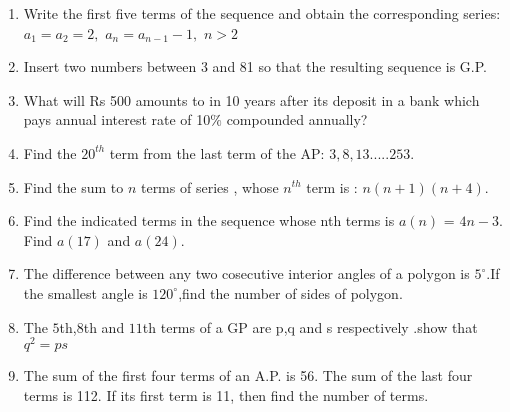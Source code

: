 \begin{enumerate}[label=\thesection.\arabic*,ref=\thesection.\theenumi]
\item Write the first five terms of the sequence and obtain the corresponding series:\\
$a_1=a_2=2,$ $a_n=a_{n-1} -1,$ $n>2$\\
\solution

\pagebreak
\item Insert two numbers between 3 and 81 so that the resulting sequence is G.P.\\

\solution

\pagebreak

\item  What will Rs 500 amounts to in 10 years after its deposit in a bank which pays annual interest rate of 10$\%$ compounded annually?

\solution
    
\pagebreak

\item Find the $20^{th}$ term from the last term of the AP: $3,8,13.....253$.

\solution


\pagebreak
\item Find the sum to $n$ terms of series , whose $n^{th}$ term is : $n(n+1)(n+4)$.

\solution

\pagebreak

\item Find the indicated terms in the sequence whose nth terms is $a(n)$ = $4n-3$. Find $a(17)$ and $a(24)$.
    
\solution 

\pagebreak

\item The difference between any two cosecutive interior angles of a polygon is $5^\circ$.If the smallest angle is $120^\circ$,find the number of sides of polygon. \\
\solution

\pagebreak
\item The $5$th,$8$th and $11$th terms of a GP are p,q and s respectively .show that $q^2=ps$ \\
\solution

\pagebreak
\item The sum of the first four terms of an A.P. is 56. The sum of the last four terms is
 112. If its first term is 11, then find the number of terms.\\
\solution

\pagebreak
\end{enumerate}
